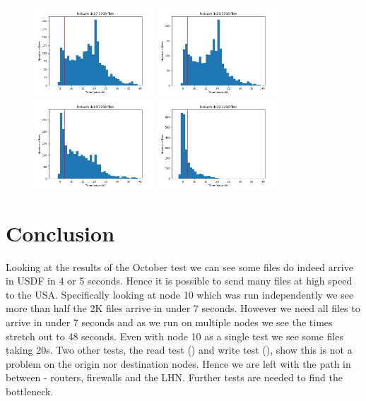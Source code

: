 \begin{figure}
\includegraphics[width=0.4\textwidth]{plots/lsstcam-dc07}
\includegraphics[width=0.4\textwidth]{plots/lsstcam-dc08}\\
\includegraphics[width=0.4\textwidth]{plots/lsstcam-dc09}
\includegraphics[width=0.4\textwidth]{plots/lsstcam-dc10}
\end{figure}

\section{Conclusion}
Looking at the results of the October test we can see some files do indeed arrive in USDF in 4 or 5 seconds.
Hence it is possible to send many files at high speed to the USA.
Specifically looking at node 10 which was run independently we see more than half the 2K files arrive in under 7 seconds.
However we need all files to arrive in under 7 seconds and as we run on multiple nodes we see the times stretch out to 48 seconds.
Even with node 10 as a single test we see some  files taking 20s.
Two other tests, the read test ()  and write test (),  show this is not a problem on the origin nor destination nodes.
Hence we are left with the path in between - routers, firewalls and the LHN.
Further tests are needed to find the bottleneck.
